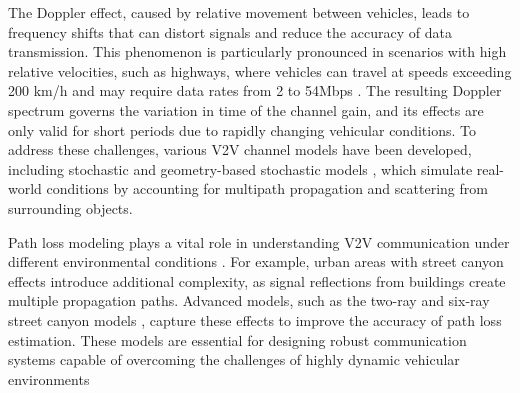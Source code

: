 The Doppler effect, caused by relative movement between vehicles, leads to frequency shifts that can distort signals and reduce the accuracy of data transmission. This phenomenon is particularly pronounced in scenarios with high relative velocities, such as highways, where vehicles can travel at speeds exceeding 200 km/h and may require data rates from 2 to 54Mbps \cite{7763324}. The resulting Doppler spectrum governs the variation in time of the channel gain, and its effects are only valid for short periods due to rapidly changing vehicular conditions. To address these challenges, various V2V channel models have been developed, including stochastic and geometry-based stochastic models \cite{Karedal2009}, which simulate real-world conditions by accounting for multipath propagation and scattering from surrounding objects.

Path loss modeling plays a vital role in understanding V2V communication under different environmental conditions \cite{Karedal2011}. For example, urban areas with street canyon effects introduce additional complexity, as signal reflections from buildings create multiple propagation paths. Advanced models, such as the two-ray and six-ray street canyon models \cite{7763324}, capture these effects to improve the accuracy of path loss estimation. These models are essential for designing robust communication systems capable of overcoming the challenges of highly dynamic vehicular environments

